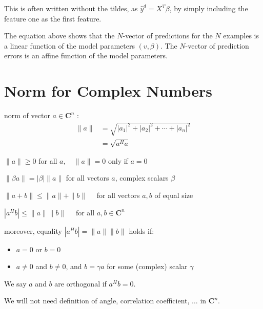  This is often written without the tildes, as $ \hat{y}^{{d}}=X^{T} \beta $, by simply including the feature one as the first feature.

The equation above shows that the $ N $-vector of predictions for the $ N $ examples is a linear function of the model parameters $ (v, \beta) $. The $ N $-vector of prediction errors is an affine function of the model parameters.


\section{Norm for Complex Numbers}

\begin{definition}
    norm of vector $ a \in \mathbf{C}^{n} $ :
\begin{equation}
\begin{aligned}
\|a\| &=\sqrt{\left|a_{1}\right|^{2}+\left|a_{2}\right|^{2}+\cdots+\left|a_{n}\right|^{2}} \\
&=\sqrt{a^{H} a}
\end{aligned}
\end{equation}
\end{definition}

\begin{theorem}
$ \|a\| \geq 0 $ for all $ a, \quad\|a\|=0  $ only if $ a=0 $
\end{theorem}

\begin{theorem}
    [Homogeneous]
$ \|\beta a\|=|\beta|\|a\| $ for all vectors $ a $, complex scalars $ \beta $
\end{theorem}

\begin{theorem}
$ \|a+b\| \leq\|a\|+\|b\| \quad $ for all vectors $ a, b $ of equal size
\end{theorem}

\begin{theorem}
    $ \left|a^{H} b\right| \leq\|a\|\|b\| \quad $ for all $ a, b \in \mathbf{C}^{n} $

    moreover, equality $ \left|a^{H} b\right|=\|a\|\|b\| $ holds if:

    \begin{itemize}
        \item $ a=0 $ or $ b=0 $
        \item $ a \neq 0 $ and $ b \neq 0 $, and $ b=\gamma a $ for some (complex) scalar $ \gamma $
    \end{itemize}
\end{theorem}

We say $ a $ and $ b $ are orthogonal if $ a^{H} b=0 $.

We will not need definition of angle, correlation coefficient, $ \ldots $ in $ \mathbf{C}^{n} $.
